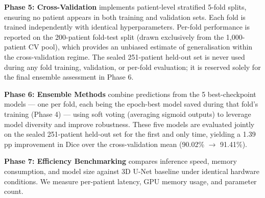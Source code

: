 \documentclass{article}
\begin{document}
\textbf{Phase 5: Cross-Validation} implements patient-level stratified 5-fold splits, ensuring no patient appears in both training and validation sets. Each fold is trained independently with identical hyperparameters. Per-fold performance is reported on the 200-patient fold-test split (drawn exclusively from the 1,000-patient CV pool), which provides an unbiased estimate of generalisation within the cross-validation regime. The sealed 251-patient held-out set is never used during any fold training, validation, or per-fold evaluation; it is reserved solely for the final ensemble assessment in Phase 6.

\textbf{Phase 6: Ensemble Methods} combine predictions from the 5 best-checkpoint models — one per fold, each being the epoch-best model saved during that fold's training (Phase 4) — using soft voting (averaging sigmoid outputs) to leverage model diversity and improve robustness. These five models are evaluated jointly on the sealed 251-patient held-out set for the first and only time, yielding a 1.39\,pp improvement in Dice over the cross-validation mean (90.02\% $\rightarrow$ 91.41\%).

\textbf{Phase 7: Efficiency Benchmarking} compares inference speed, memory consumption, and model size against 3D U-Net baseline under identical hardware conditions. We measure per-patient latency, GPU memory usage, and parameter count.
\end{document}
